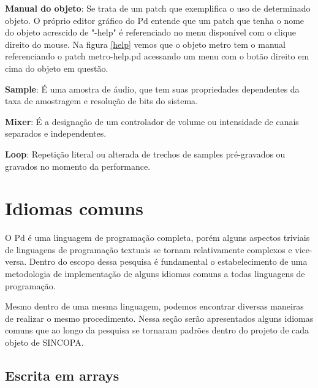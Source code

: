 \documentclass[draft]{ppgmus}
\begin{document}
\textbf{Manual do objeto}: Se trata de um patch que exemplifica o uso de determinado
objeto. O próprio editor gráfico do Pd entende que um patch que tenha o nome do objeto 
acrescido de "-help" é referenciado no menu disponível com o clique direito do mouse. 
Na figura \ref{help} vemos que o objeto metro tem o manual
referenciando o patch metro-help.pd acessando um 
menu com o botão direito em cima do objeto em questão.



\textbf{Sample}: É uma amostra de áudio, que tem suas propriedades dependentes da
taxa de amostragem e resolução de bits do sistema.


\textbf{Mixer}: É a designação de um controlador de volume ou intensidade de canais separados 
e independentes.

\textbf{Loop}: Repetição literal ou alterada de trechos de samples pré-gravados ou
gravados no momento da performance.


\section{Idiomas comuns}


O Pd é uma linguagem de programação completa, porém alguns aspectos triviais
de linguagens de programação textuais se tornam relativamente complexos e vice-versa.
Dentro do escopo dessa pesquisa é fundamental o estabelecimento de uma metodologia de
implementação de alguns idiomas comuns a todas linguagens de programação.

Mesmo dentro de uma mesma linguagem, podemos encontrar diversas maneiras
de realizar o mesmo procedimento. Nessa seção serão apresentados alguns idiomas comuns 
que ao longo da pesquisa se tornaram padrões dentro do projeto de cada
objeto de SINCOPA.
 
\subsection{Escrita em arrays}
\end{document}
